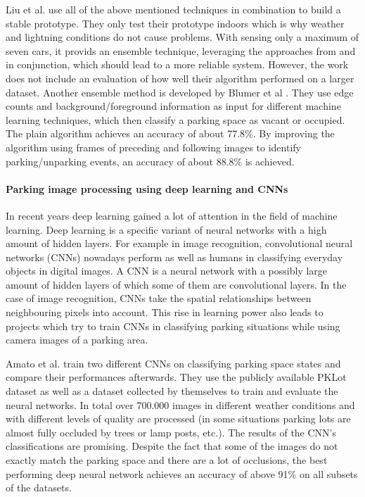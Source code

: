 Liu et al. \cite{stationary_camera_sensing} use all of the above mentioned techniques in combination to build a stable prototype. They only test their prototype indoors which is why weather and lightning conditions do not cause problems. With sensing only a maximum of seven cars, it provids an ensemble technique, leveraging the approaches from \cite{Blumer2012} and \cite{stationary_camera_sensing} in conjunction, which should lead to a more reliable system. However, the work does not include an evaluation of how well their algorithm performed on a larger dataset. Another ensemble method is developed by Blumer et al \cite{Blumer2012}. They use edge counts and background/foreground information as input for different machine learning techniques, which then classify a parking space as vacant or occupied. The plain algorithm achieves an accuracy of about 77.8\%. By improving the algorithm using frames of preceding and following images to identify parking/unparking events, an accuracy of about 88.8\% is achieved.



\paragraph{Parking image processing using deep learning and CNNs}

In recent years deep learning gained a lot of attention in the field of machine learning. Deep learning is a specific variant of neural networks with a high amount of hidden layers. For example in image recognition, convolutional neural networks (CNNs) nowadays perform as well as humans in classifying everyday objects in digital images. A CNN is a neural network with a possibly large amount of hidden layers of which some of them are convolutional layers. In the case of image recognition, CNNs take the spatial relationships between neighbouring pixels into account. This rise in learning power also leads to projects which try to train CNNs in classifying parking situations while using camera images of a parking area.

Amato et al. \cite{Amato2016} train two different CNNs on classifying parking space states and compare their performances afterwards. They use the publicly available PKLot dataset as well as a dataset collected by themselves to train and evaluate the neural networks. In total over 700.000 images in different weather conditions and with different levels of quality are processed (in some situations parking lots are almost fully occluded by trees or lamp posts, etc.). The results of the CNN's classifications are promising. Despite the fact that some of the images do not exactly match the parking space and there are a lot of occlusions, the best performing deep neural network achieves an accuracy of above 91\% on all subsets of the datasets.

